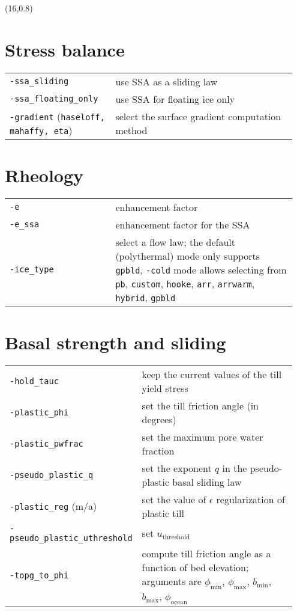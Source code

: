 \documentclass[landscape]{article}
\begin{document}
\begin{textblock}{15}(16,0.8)


\section{Stress balance}
\label{sec:stress-balance}

\begin{tabular}{@{}p{0.35\linewidth}p{0.6\linewidth}@{}}
\texttt{-ssa_sliding} & use SSA as a sliding law\\
\texttt{-ssa_floating_only} & use SSA for floating ice only\\
\texttt{-gradient} (\texttt{haseloff, mahaffy, eta})& select the surface
gradient computation method\\
\end{tabular}

\section{Rheology}
\label{sec:rheology}
\begin{tabular}{@{}p{0.35\linewidth}p{0.6\linewidth}@{}}
\texttt{-e} & enhancement factor\\
\texttt{-e_ssa} & enhancement factor for the SSA\\
\texttt{-ice_type} & select a flow law; the default (polythermal) mode only
supports \texttt{gpbld}, \texttt{-cold} mode allows selecting from \texttt{pb},
\texttt{custom}, \texttt{hooke}, \texttt{arr}, \texttt{arrwarm},
\texttt{hybrid}, \texttt{gpbld}\\
\end{tabular}


\section{Basal strength and sliding}
\label{sec:basal-strength}
\begin{tabular}{@{}p{0.35\linewidth}p{0.6\linewidth}@{}}
\texttt{-hold_tauc} & keep the current values of the till yield stress\\
\texttt{-plastic_phi} & set the till friction angle (in degrees)\\
\texttt{-plastic_pwfrac} & set the maximum pore water fraction\\
\texttt{-pseudo_plastic_q} & set the exponent $q$ in the pseudo-plastic basal
sliding law\\
\texttt{-plastic_reg} (m/a) & set the value of $\epsilon$ regularization of plastic
till\\
\texttt{-pseudo_plastic_uthreshold} & set $u_{\mathrm{threshold}}$\\
\texttt{-topg_to_phi} & compute till friction angle as a function of bed
elevation; arguments are $\phi_{\mathrm{min}}$, $\phi_{\mathrm{max}}$, $b_{\mathrm{min}}$, $b_{\mathrm{max}}$, $\phi_{\mathrm{ocean}}$
\end{tabular}



\end{textblock}
\end{document}
